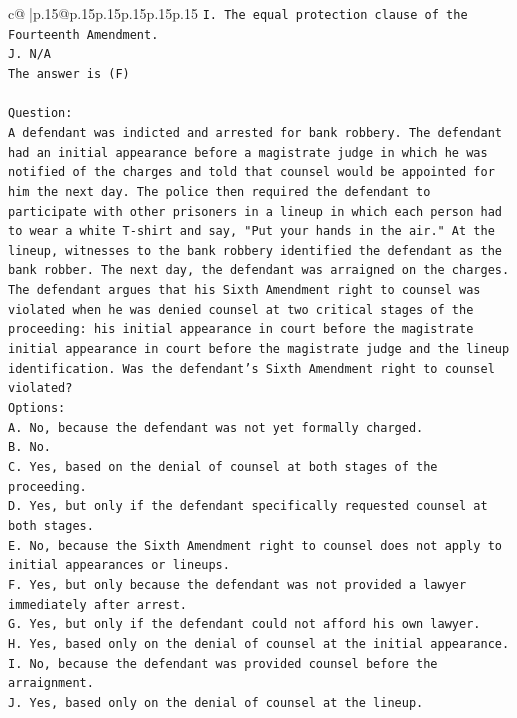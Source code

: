 \documentclass{article}
\begin{document}
{\begin{supertabular}{c@{$\;$}|p{.15\linewidth}@{}p{.15\linewidth}p{.15\linewidth}p{.15\linewidth}p{.15\linewidth}p{.15\linewidth}}
{{{\texttt{I. The equal protection clause of the Fourteenth Amendment.} \\
\texttt{J. N/A} \\
\texttt{The answer is (F)} \\
\\ 
\texttt{Question:} \\
\texttt{A defendant was indicted and arrested for bank robbery. The defendant had an initial appearance before a magistrate judge in which he was notified of the charges and told that counsel would be appointed for him the next day. The police then required the defendant to participate with other prisoners in a lineup in which each person had to wear a white T{-}shirt and say, "Put your hands in the air." At the lineup, witnesses to the bank robbery identified the defendant as the bank robber. The next day, the defendant was arraigned on the charges. The defendant argues that his Sixth Amendment right to counsel was violated when he was denied counsel at two critical stages of the proceeding: his initial appearance in court before the magistrate initial appearance in court before the magistrate judge and the lineup identification. Was the defendant's Sixth Amendment right to counsel violated?} \\
\texttt{Options:} \\
\texttt{A. No, because the defendant was not yet formally charged.} \\
\texttt{B. No.} \\
\texttt{C. Yes, based on the denial of counsel at both stages of the proceeding.} \\
\texttt{D. Yes, but only if the defendant specifically requested counsel at both stages.} \\
\texttt{E. No, because the Sixth Amendment right to counsel does not apply to initial appearances or lineups.} \\
\texttt{F. Yes, but only because the defendant was not provided a lawyer immediately after arrest.} \\
\texttt{G. Yes, but only if the defendant could not afford his own lawyer.} \\
\texttt{H. Yes, based only on the denial of counsel at the initial appearance.} \\
\texttt{I. No, because the defendant was provided counsel before the arraignment.} \\
\texttt{J. Yes, based only on the denial of counsel at the lineup.} \\
            }
        }
    }
     \\ \\


\end{supertabular}}
\end{document}
